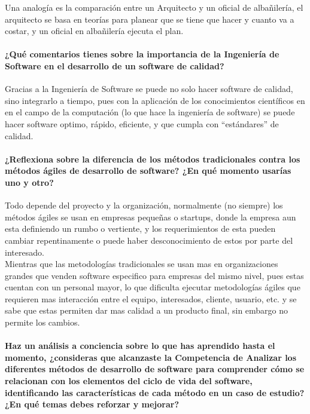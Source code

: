 \documentclass[spanish,12pt,letterpapper]{article}
\begin{document}
Una analogía es la comparación entre un Arquitecto y un oficial de albañilería, el arquitecto se basa en teorías para planear que se tiene que hacer y cuanto va a costar, y un oficial en albañilería ejecuta el plan.\\
	
	\paragraph{ ¿Qué comentarios tienes sobre la importancia de la Ingeniería de Software en el desarrollo de un software de calidad?\\}
	Gracias a la Ingeniería de Software se puede no solo hacer software de calidad, sino integrarlo a tiempo, pues con la aplicación de los conocimientos científicos en en el campo de la computación (lo que hace la ingeniería de software) se puede hacer software optimo, rápido, eficiente, y que cumpla con ``estándares'' de calidad.
	
	\paragraph{¿Reflexiona sobre la diferencia de los métodos tradicionales contra los métodos ágiles de desarrollo de software? ¿En qué momento usarías uno y otro?\\}
	Todo depende del proyecto y la organización, normalmente (no siempre) los métodos ágiles se usan en empresas pequeñas o startups, donde la empresa aun esta definiendo un rumbo o vertiente, y los requerimientos de esta pueden cambiar repentinamente o puede haber desconocimiento de estos por parte del interesado.\\
	
	Mientras que las metodologías tradicionales se usan mas en organizaciones grandes que venden software especifico para empresas del mismo nivel, pues estas cuentan con un personal mayor, lo que dificulta ejecutar metodologías ágiles que requieren mas interacción entre el equipo, interesados, cliente, usuario, etc. y se sabe que estas permiten dar mas calidad a un producto final, sin embargo no permite los cambios.
	
	\paragraph{ Haz un análisis  a conciencia sobre lo que has aprendido hasta el momento, ¿consideras que alcanzaste la Competencia de Analizar los diferentes métodos de desarrollo de software para comprender cómo se relacionan con los elementos del ciclo de vida del software, identificando las características de cada método en un caso de estudio? ¿En qué temas debes reforzar y mejorar?\\}
	
\end{document}
